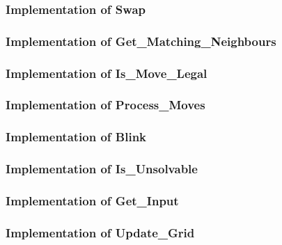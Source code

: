 \subsubsection{Implementation of Swap}


\subsubsection{Implementation of Get\_Matching\_Neighbours}


\newpage

\subsubsection{Implementation of Is\_Move\_Legal}


\subsubsection{Implementation of Process\_Moves}


\newpage

\subsubsection{Implementation of Blink}


\newpage

\subsubsection{Implementation of Is\_Unsolvable}


\newpage

\subsubsection{Implementation of Get\_Input}


\subsubsection{Implementation of Update\_Grid}


